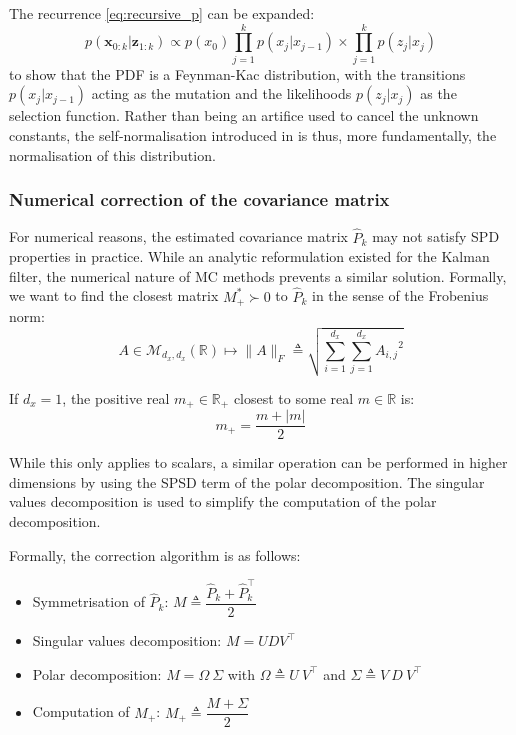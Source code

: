 \begin{remark}
	The recurrence \eqref{eq:recursive_p} can be expanded:
	\begin{equation}
		p(\mathbf{x}_{0:k}|\mathbf{z}_{1:k})\propto p(x_0)\prod_{j=1}^kp(x_j|x_{j-1})\times\prod_{j=1}^kp(z_j|x_j)
	\end{equation}
	to show that the PDF is a Feynman-Kac distribution, with the transitions $p(x_j|x_{j-1})$ acting as the mutation and the likelihoods $p(z_j|x_j)$ as the selection function. Rather than being an artifice used to cancel the unknown constants, the self-norma\-lisation introduced in  is thus, more fundamentally, the normalisation of this distribution.
\end{remark}

\subsubsection{Numerical correction of the covariance matrix}

For numerical reasons, the estimated covariance matrix $\hat{P}_k$ may not satisfy SPD properties in practice. While an analytic reformulation existed for the Kalman filter, the numerical nature of MC methods prevents a similar solution. Formally, we want to find the closest matrix $M_+^*\succ0$ to $\hat{P}_k$ in the sense of the Frobenius norm:
\begin{equation}
	A\in\mathcal{M}_{d_x,d_x}(\mathbb{R})\mapsto\|A\|_F\triangleq\sqrt{\sum_{i=1}^{d_x}\sum_{j=1}^{d_x}{A_{i,j}}^2}
\end{equation}

If $d_x=1$, the positive real $m_+\in\mathbb{R}_+$ closest to some real $m\in\mathbb{R}$ is:
\begin{equation}
	m_+=\frac{m+|m|}{2}
\end{equation}

While this only applies to scalars, a similar operation can be performed in higher dimensions by using the SPSD term of the polar decomposition. The singular values decomposition is used to simplify the computation of the polar decomposition.

Formally, the correction algorithm is as follows:
\begin{itemize}
	\item Symmetrisation of $\hat{P}_k$: $M\triangleq\dfrac{\hat{P}_k+\hat{P}_k^\top}{2}$
	\item Singular values decomposition: $M=UDV^\top$
	\item Polar decomposition: $M=\Omega\:\Sigma$ with $\Omega\triangleq U\:V^\top$ and $\Sigma\triangleq V\:D\:V^\top$
	\item Computation of $M_+$: $M_+\triangleq\dfrac{M+\Sigma}{2}$
\end{itemize}

